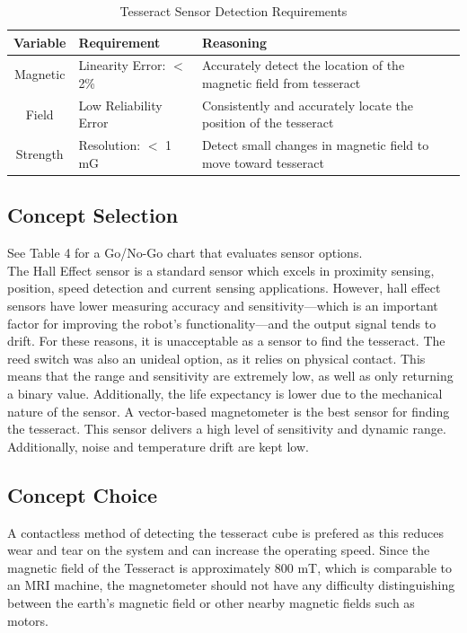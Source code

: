\documentclass[12pt]{article}
\begin{document}
\begin{table}[htbp]
  \centering
  \caption{Tesseract Sensor Detection Requirements}
    \begin{tabular}{c|p{11.5em}|p{29.89em}}
    \multicolumn{1}{p{5.5em}|}{\textbf{Variable}} & \textbf{Requirement} & \textbf{Reasoning} \bigstrut[b]\\
    \hline
    Magnetic & Linearity Error: $<$ 2\% & Accurately detect the location of the magnetic field from tesseract \bigstrut[t]\\
    Field  & Low Reliability Error & Consistently and accurately locate the position of the tesseract \\
    Strength & Resolution: $<$ 1 mG & Detect small changes in magnetic field to move toward tesseract \\
    \end{tabular}%
  \label{tab:addlabel}%
\end{table}%


\subsection{Concept Selection}
See Table 4 for a Go/No-Go chart that evaluates sensor options.\\ 
The Hall Effect sensor is a standard sensor which excels in proximity sensing, position, speed detection and current sensing applications. However, hall effect sensors have lower measuring accuracy and sensitivity—which is an important factor for improving the robot’s functionality—and the output signal tends to drift. For these reasons, it is unacceptable as a sensor to find the tesseract.
The reed switch was also an unideal option, as it relies on physical contact. This means that the range and sensitivity are extremely low, as well as only returning a binary value. Additionally, the life expectancy is lower due to the mechanical nature of the sensor.
A vector-based magnetometer is the best sensor for finding the tesseract. This sensor delivers a high level of sensitivity and dynamic range. Additionally, noise and temperature drift are kept low. 

\subsection{Concept Choice}
A contactless method of detecting the tesseract cube is prefered as this reduces wear and tear on the system and can increase the operating speed. Since the magnetic field of the Tesseract is approximately 800 mT, which is comparable to an MRI machine, the magnetometer should not have any difficulty distinguishing between the earth’s magnetic field or other nearby magnetic fields such as motors.
\end{document}
